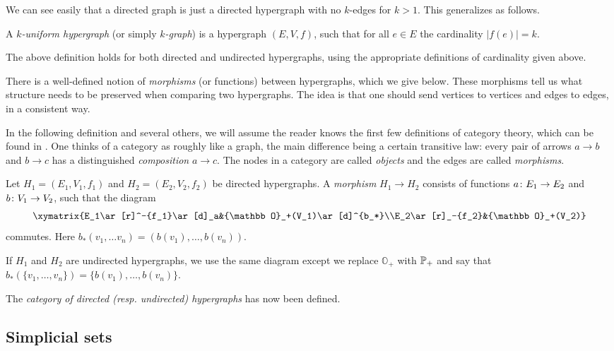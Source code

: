 \documentclass{amsart}
\def\OO{{\mathbb O}}
\begin{document}
We can see easily that a directed graph is just a directed hypergraph with no $k$-edges for $k>1$.  This generalizes as follows. 

\begin{definition}

A {\em $k$-uniform hypergraph} (or simply {\em $k$-graph}) is a hypergraph $(E,V,f)$, such that for all $e\in E$ the cardinality $|f(e)|=k$. 

\end{definition}

The above definition holds for both directed and undirected hypergraphs, using the appropriate definitions of cardinality given above.

There is a well-defined notion of {\em morphisms} (or functions) between hypergraphs, which we give below.  These morphisms tell us what structure needs to be preserved when comparing two hypergraphs.  The idea is that one should send vertices to vertices and edges to edges, in a consistent way.

In the following definition and several others, we will assume the reader knows the first few definitions of category theory, which can be found in \cite{MacLane}.  One thinks of a category as roughly like a graph, the main difference being a certain transitive law: every pair of arrows $a\to b$ and $b\to c$ has a distinguished {\em composition} $a\to c$.  The nodes in a category are called {\em objects} and the edges are called {\em morphisms}.

\begin{definition}

Let $H_1=(E_1,V_1,f_1)$ and $H_2=(E_2,V_2,f_2)$ be directed hypergraphs.  A {\em morphism} $H_1\to H_2$ consists of functions $a\colon E_1\rightarrow E_2$ and $b\colon V_1\rightarrow V_2$, such that the diagram $$\xymatrix{E_1\ar[r]^-{f_1}\ar[d]_a&\OO_+(V_1)\ar[d]^{b_*}\\E_2\ar[r]_-{f_2}&\OO_+(V_2)}$$ commutes.  Here $b_*(v_1,\ldots v_n)=(b(v_1),\ldots,b(v_n))$.

If $H_1$ and $H_2$ are undirected hypergraphs, we use the same diagram except we replace $\OO_+$ with ${\mathbb P}_+$ and say that $b_*(\{v_1,\ldots,v_n\})=\{b(v_1),\ldots,b(v_n)\}$.

The {\em category of directed ({\tn resp.} undirected) hypergraphs} has now been defined.

\end{definition}

\subsection{Simplicial sets}
\end{document}
